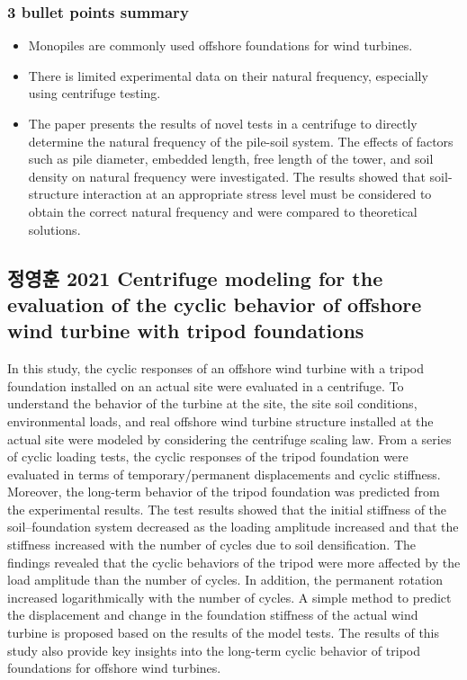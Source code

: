 \documentclass[
  letterpaper,
  DIV=11,
  numbers=noendperiod]{scrreprt}
\providecommand{\tightlist}{%
  \setlength{\itemsep}{0pt}\setlength{\parskip}{0pt}}\usepackage{longtable,booktabs,array}
\begin{document}
\hypertarget{bullet-points-summary-2}{%
\subsubsection{3 bullet points summary}\label{bullet-points-summary-2}}

\begin{itemize}
\tightlist
\item
  Monopiles are commonly used offshore foundations for wind turbines.
\item
  There is limited experimental data on their natural frequency,
  especially using centrifuge testing.
\item
  The paper presents the results of novel tests in a centrifuge to
  directly determine the natural frequency of the pile-soil system. The
  effects of factors such as pile diameter, embedded length, free length
  of the tower, and soil density on natural frequency were investigated.
  The results showed that soil-structure interaction at an appropriate
  stress level must be considered to obtain the correct natural
  frequency and were compared to theoretical solutions.
\end{itemize}

\hypertarget{uxc815uxc601uxd6c8-2021-centrifuge-modeling-for-the-evaluation-of-the-cyclic-behavior-of-offshore-wind-turbine-with-tripod-foundations}{%
\subsection{정영훈 2021 Centrifuge modeling for the evaluation of the
cyclic behavior of offshore wind turbine with tripod
foundations}\label{uxc815uxc601uxd6c8-2021-centrifuge-modeling-for-the-evaluation-of-the-cyclic-behavior-of-offshore-wind-turbine-with-tripod-foundations}}

In this study, the cyclic responses of an offshore wind turbine with a
tripod foundation installed on an actual site were evaluated in a
centrifuge. To understand the behavior of the turbine at the site, the
site soil conditions, environmental loads, and real offshore wind
turbine structure installed at the actual site were modeled by
considering the centrifuge scaling law. From a series of cyclic loading
tests, the cyclic responses of the tripod foundation were evaluated in
terms of temporary/permanent displacements and cyclic stiffness.
Moreover, the long-term behavior of the tripod foundation was predicted
from the experimental results. The test results showed that the initial
stiffness of the soil--foundation system decreased as the loading
amplitude increased and that the stiffness increased with the number of
cycles due to soil densification. The findings revealed that the cyclic
behaviors of the tripod were more affected by the load amplitude than
the number of cycles. In addition, the permanent rotation increased
logarithmically with the number of cycles. A simple method to predict
the displacement and change in the foundation stiffness of the actual
wind turbine is proposed based on the results of the model tests. The
results of this study also provide key insights into the long-term
cyclic behavior of tripod foundations for offshore wind turbines.
\end{document}
